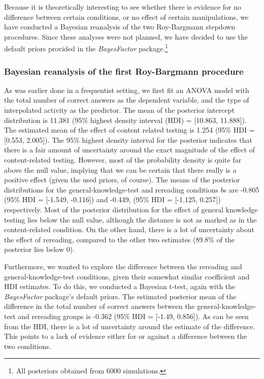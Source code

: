 \documentclass[../main.tex]{subfiles}
\begin{document}
Because it is theoretically interesting to see whether there is evidence
for no difference between certain conditions, or no effect of certain
manipulations, we have conducted a Bayesian reanalysis of the two
Roy-Bargmann stepdown procedures. Since these analyses were not planned,
we have decided to use the default priors provided in the
\textit{BayesFactor} \citep{moreyBayesFactorComputationBayes2018}
package.\footnote{All posteriors obtained from 6000 simulations.}

\hypertarget{bayesian-reanalysis-of-the-first-roy-bargmann-procedure}{%
\subsubsection{Bayesian reanalysis of the first Roy-Bargmann
procedure}\label{bayesian-reanalysis-of-the-first-roy-bargmann-procedure}}

As was earlier done in a frequentist setting, we first fit an ANOVA
model with the total number of correct answers as the dependent
variable, and the type of interpolated activity as the predictor. The
mean of the posterior intercept distribution is 11.381 (95\% highest
density interval (HDI) = {[}10.863, 11.888{]}). The estimated mean of
the effect of content related testing is 1.254 (95\% HDI = {[}0.553,
2.005{]}). The 95\% highest density interval for the posterior indicates
that there is a fair amount of uncertainty around the exact magnitude of
the effect of content-related testing. However, most of the probability
density is quite far above the null value, implying that we can be
certain that there really is a positive effect (given the used priors,
of course). The means of the posterior distributions for the
general-knowledge-test and rereading conditions \(b\)s are -0.805 (95\%
HDI = {[}-1.549, -0.116{]}) and -0.449, (95\% HDI = {[}-1.125, 0.257{]})
respectively. Most of the posterior distribution for the effect of
general knowledge testing lies below the null value, although the
distance is not as marked as in the content-related condition. On the
other hand, there is a lot of uncertainty about the effect of rereading,
compared to the other two estimates (89.8\% of the posterior lies below
0).

Furthermore, we wanted to explore the difference between the rereading
and general-knowledge-test conditions, given their somewhat similar
coefficient and HDI estimates. To do this, we conducted a Bayesian
t-test, again with the \textit{BayesFactor} package's default priors.
The estimated posterior mean of the difference in the total number of
correct answers between the general-knowledge-test and rereading groups
is -0.362 (95\% HDI = {[}-1.49, 0.856{]}). As can be seen from the HDI,
there is a lot of uncertainty around the estimate of the difference.
This points to a lack of evidence either for or against a difference
between the two conditions.
\end{document}
